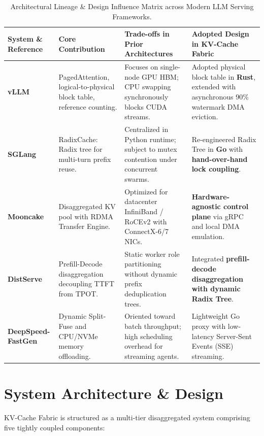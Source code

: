 \documentclass[10pt,twocolumn,letterpaper]{article}
\begin{document}
\begin{table}[t]
\centering
\small
\caption{Architectural Lineage \& Design Influence Matrix across Modern LLM Serving Frameworks.}
\label{tab:lineage}
\begin{tabularx}{\textwidth}{p{3.2cm}p{3.2cm}Xp{4.2cm}}
\toprule
\textbf{System \& Reference} & \textbf{Core Contribution} & \textbf{Trade-offs in Prior Architectures} & \textbf{Adopted Design in KV-Cache Fabric} \\
\midrule
\textbf{vLLM}~\cite{kwon2023pagedattention} & PagedAttention, logical-to-physical block table, reference counting. & Focuses on single-node GPU HBM; CPU swapping synchronously blocks CUDA streams. & Adopted physical block table in \textbf{Rust}, extended with asynchronous 90\% watermark DMA eviction. \\
\addlinespace
\textbf{SGLang}~\cite{zheng2023sglang} & RadixCache: Radix tree for multi-turn prefix reuse. & Centralized in Python runtime; subject to mutex contention under concurrent swarms. & Re-engineered Radix Tree in \textbf{Go} with \textbf{hand-over-hand lock coupling}. \\
\addlinespace
\textbf{Mooncake}~\cite{mooncake2024} & Disaggregated KV pool with RDMA Transfer Engine. & Optimized for datacenter InfiniBand / RoCEv2 with ConnectX-6/7 NICs. & \textbf{Hardware-agnostic control plane} via gRPC and local DMA emulation. \\
\addlinespace
\textbf{DistServe}~\cite{zhong2024distserve} & Prefill-Decode disaggregation decoupling TTFT from TPOT. & Static worker role partitioning without dynamic prefix deduplication trees. & Integrated \textbf{prefill-decode disaggregation with dynamic Radix Tree}. \\
\addlinespace
\textbf{DeepSpeed-FastGen} & Dynamic Split-Fuse and CPU/NVMe memory offloading. & Oriented toward batch throughput; high scheduling overhead for streaming agents. & Lightweight Go proxy with low-latency Server-Sent Events (SSE) streaming. \\
\bottomrule
\end{tabularx}
\end{table}

\section{System Architecture \& Design}

KV-Cache Fabric is structured as a multi-tier disaggregated system comprising five tightly coupled components:
\end{document}
